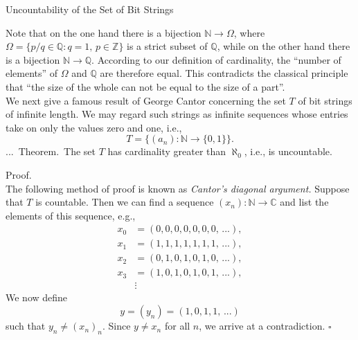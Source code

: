 \documentclass[smaller,hyperref={CJKbookmarks=true}]{beamer}
\newcommand{\N}{\mathbb{N}} \newcommand{\Z}{\mathbb{Z}} \newcommand{\Q}{\mathbb{Q}}
\newcommand{\C}{\mathbb{C}}
\newenvironment{PROOF}{{\noindent\!\sf\alert{Proof.}}\\}{\hfill$\square$\\}
\newcounter{zhuo}[subsection]
\renewcommand{\thezhuo}{\thesection.\thesubsection.\arabic{zhuo}}
\newenvironment{THEOREM}{\stepcounter{zhuo}\alert{\thezhuo.~Theorem.\,}}{}
\begin{document}
\begin{frame}{Uncountability of the Set of Bit Strings}
\begin{spacing}{1.1}
Note that on the one hand there is a bijection $\N\rightarrow\Omega$, where $\Omega=\{p/q\in\Q\!:q=1,\,p\in\Z\}$ is a strict subset of $\Q$, while on the other hand there is a bijection $\N\rightarrow\Q$. According to our definition of cardinality, the ``number of elements'' of $\Omega$ and $\Q$ are therefore equal. This contradicts the classical principle that ``the size of the whole can not be equal to the size of a part''.\\[5pt]
We next give a famous result of George Cantor concerning the set $T$ of bit
strings of infinite length. We may regard such strings as infinite sequences
whose entries take on only the values zero and one, i.e.,
\[T=\big\{(a_n):\N\rightarrow\{0,1\}\big\}.\]
\begin{THEOREM}
The set $T$ has cardinality greater than $\aleph_0$, i.e., is uncountable.
\end{THEOREM}
\end{spacing}
\newpage
\begin{spacing}{1}
\begin{PROOF}
The following method of proof is known as \emph{Cantor's diagonal argument.} Suppose that $T$ is countable. Then we can find a sequence $(x_n)\!:\N\to\C$ and list the elements of this sequence, e.g.,
\begin{align*}
  x_0 &=(0,0,0,0,0,0,0,\,...), \\
  x_1 &=(1,1,1,1,1,1,1,\,...), \\
  x_2 &=(0,1,0,1,0,1,0,\,...), \\
  x_3 &=(1,0,1,0,1,0,1,\,...), \\
      &\vdots
\end{align*}
We now define
\[y=(y_n)=(1,0,1,1,\,...)\]
such that $y_n\neq(x_n)_n$. Since $y\neq x_n$ for all $n$, we arrive at a contradiction.
\end{PROOF}
\end{spacing}
\end{frame}
\end{document}

